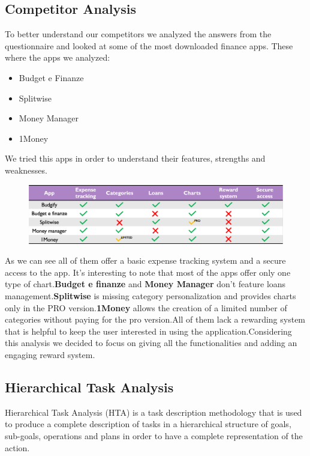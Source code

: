 \documentclass[a4paper,12pt]{article}
\begin{document}
\subsection{Competitor Analysis}
To better understand our competitors we analyzed the answers from the questionnaire and looked at some of the most downloaded finance apps. These where the apps we analyzed:
\begin{itemize}
    \item Budget e Finanze
    \item Splitwise
    \item Money Manager
    \item 1Money
\end{itemize}
We tried this apps in order to understand their features, strengths and weaknesses.
\begin{figure}[H]
    \centering
    \includegraphics[width=\linewidth]{Competitors_table.png}
\end{figure}
\noindent As we can see all of them offer a basic expense tracking system and a secure access to the app. It's interesting to note that most of the apps offer only one type of chart.\newline \textbf{Budget e finanze} and \textbf{Money Manager} don't feature loans management.\newline \textbf{Splitwise} is missing category personalization and provides charts only in the PRO version.\newline \textbf{1Money} allows the creation of a limited number of categories without paying for the pro version.\newline All of them lack a rewarding system that is helpful to keep the user interested in using the application.\newline Considering this analysis we decided to focus on giving all the functionalities and adding an engaging reward system.
\subsection{Hierarchical Task Analysis}

Hierarchical Task Analysis (HTA) is a task description methodology that is used to produce a complete description of tasks in a hierarchical structure of goals, sub-goals, operations and plans in order
to have a complete representation of the action.
\end{document}
